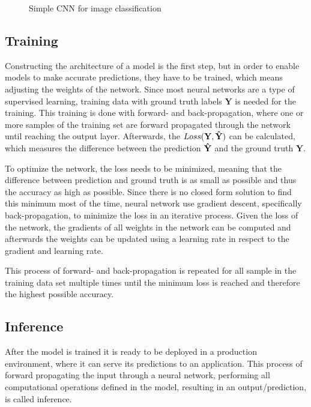 \begin{figure}[!htb]
    \centering
    \resizebox{.95\linewidth}{!}{}
    \caption{Simple CNN for image classification}
    \label{fig:simpleCNN}
\end{figure}

\subsection{Training}
Constructing the architecture of a model is the first step, but in order to enable models to make accurate predictions, they have to be trained, which means adjusting the weights of the network. 
Since most neural networks are a type of supervised learning, training data with ground truth labels $\mathbf{Y}$ is needed for the training.
This training is done with forward- and back-propagation, where one or more samples of the training set are forward propagated through the network until reaching the output layer. Afterwards, the $Loss\mathbf{(Y,\Hat{Y})}$ can be calculated, which measures the difference between the prediction $\mathbf{\Hat{Y}}$ and the ground truth $\mathbf{Y}$.

To optimize the network, the loss needs to be minimized, meaning that the difference between prediction and ground truth is as small as possible and thus the accuracy as high as possible.
Since there is no closed form solution to find this minimum most of the time, neural network use gradient descent, specifically back-propagation, to minimize the loss in an iterative process.
Given the loss of the network, the gradients of all weights in the network can be computed and afterwards the weights can be updated using a learning rate in respect to the gradient and learning rate.

This process of forward- and back-propagation is repeated for all sample in the training data set multiple times until the minimum loss is reached and therefore the highest possible accuracy.

\subsection{Inference}

After the model is trained it is ready to be deployed in a production environment, where it can serve its predictions to an application. This process of forward propagating the input through a neural network, performing all computational operations defined in the model, resulting in an output/prediction, is called inference.


